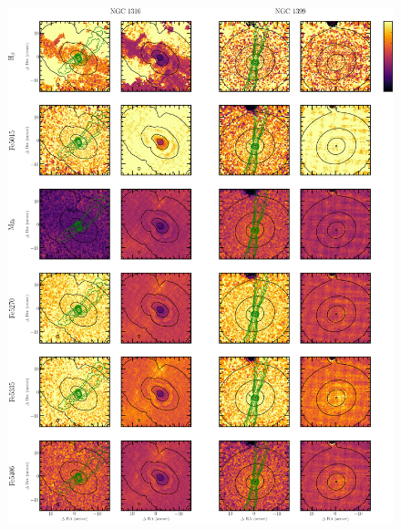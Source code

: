 		\begin{figure}
			\centering
			\includegraphics[height=0.81\textheight]{chapter4/muse/abs2.png}
		\end{figure}
